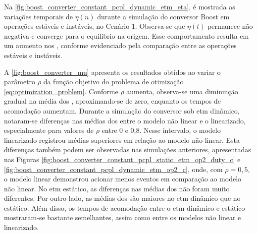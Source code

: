 Na \autoref{fig:boost_converter_constant_pcpl_dynamic_etm_eta}, é mostrada as variações temporais de $\eta(n)$ durante a simulação do conversor Boost em operações estáveis e instáveis, no Cenário 1. Observa-se que $\eta(t)$ permanece não negativa e converge para o equilíbrio na origem. Esse comportamento resulta em um aumento nos , conforme evidenciado pela comparação entre as operações estáveis e instáveis.

A \autoref{fig:boost_converter_mu} apresenta os resultados obtidos ao variar o parâmetro $\rho$ da função objetivo do problema de otimização \eqref{eq:optimization_problem}. Conforme $\rho$ aumenta, observa-se uma diminuição gradual na média dos , aproximando-se de zero, enquanto os tempos de acomodação aumentam. Durante a simulação do conversor sob \acrshort{etm} dinâmico, notaram-se diferenças nas médias dos  entre o modelo não linear e o linearizado, especialmente para valores de $\rho$ entre 0 e 0,8. Nesse intervalo, o modelo linearizado registrou médias superiores em relação ao modelo não linear. Esta diferenças também podem ser observadas nas simulações anteriores, apresentadas nas Figuras \ref{fig:boost_converter_constant_pcpl_static_etm_op2_duty_c} e \ref{fig:boost_converter_constant_pcpl_dynamic_etm_op2_c}, onde, com $\rho = 0,5$, o modelo linear demonstrou acionar menos eventos em comparação ao modelo não linear. No \acrshort{etm} estático, as diferenças nas médias dos  não foram muito diferentes. Por outro lado, as médias dos  são maiores no \acrshort{etm} dinâmico que no estático. Além disso, os tempos de acomodação entre o \acrshort{etm} dinâmico e estático mostraram-se bastante semelhantes, assim como entre os modelos não linear e linearizado.

